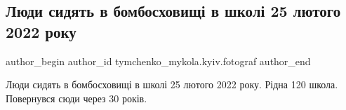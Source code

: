  
 
 
 
 

\subsection{Люди сидять в бомбосховищі в школі 25 лютого 2022 року}
\label{sec:25_02_2022.fb.tymchenko_mykola.kyiv.fotograf.1.lyudi_sidyat_v_bombo}

\ifcmt
 author_begin
   author_id tymchenko_mykola.kyiv.fotograf
 author_end
\fi

Люди сидять в бомбосховищі в школі 25 лютого 2022 року. 
Рідна 120 школа. Повернувся сюди через 30 років.
